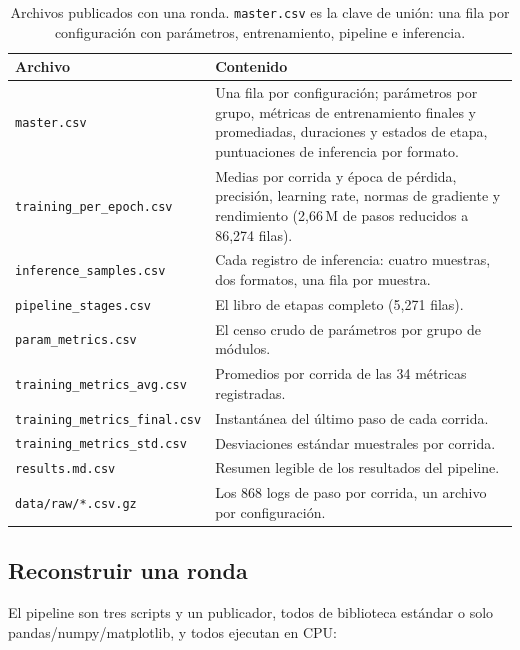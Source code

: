 \begin{table}[H]
\centering
\small
\caption{Archivos publicados con una ronda. \texttt{master.csv} es la clave de unión: una fila por configuración con parámetros, entrenamiento, pipeline e inferencia.}
\label{tab:round-datasets}
\begin{tabularx}{\linewidth}{L{5.2cm}L{9.4cm}}
\toprule
Archivo & Contenido \\
\midrule
\texttt{master.csv} & Una fila por configuración; parámetros por grupo, métricas de entrenamiento finales y promediadas, duraciones y estados de etapa, puntuaciones de inferencia por formato. \\
\texttt{training\_per\_epoch.csv} & Medias por corrida y época de pérdida, precisión, learning rate, normas de gradiente y rendimiento (2,66\,M de pasos reducidos a 86{,}274 filas). \\
\texttt{inference\_samples.csv} & Cada registro de inferencia: cuatro muestras, dos formatos, una fila por muestra. \\
\texttt{pipeline\_stages.csv} & El libro de etapas completo (5{,}271 filas). \\
\texttt{param\_metrics.csv} & El censo crudo de parámetros por grupo de módulos. \\
\texttt{training\_metrics\_avg.csv} & Promedios por corrida de las 34 métricas registradas. \\
\texttt{training\_metrics\_final.csv} & Instantánea del último paso de cada corrida. \\
\texttt{training\_metrics\_std.csv} & Desviaciones estándar muestrales por corrida. \\
\texttt{results.md.csv} & Resumen legible de los resultados del pipeline. \\
\texttt{data/raw/*.csv.gz} & Los 868 logs de paso por corrida, un archivo por configuración. \\
\bottomrule
\end{tabularx}
\end{table}

\subsection{Reconstruir una ronda}

El pipeline son tres scripts y un publicador, todos de biblioteca estándar o solo pandas/numpy/matplotlib, y todos ejecutan en CPU:

